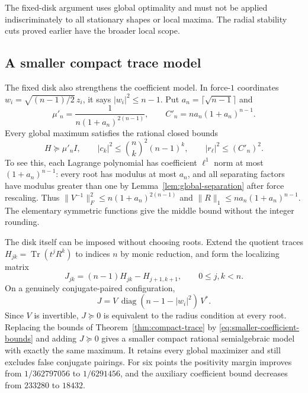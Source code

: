 \documentclass[11pt]{article}
\theoremstyle{remark}
\numberwithin{equation}{section}
\begin{document}
The fixed-disk argument uses global optimality and must not be applied
indiscriminately to all stationary shapes or local maxima. The radial
stability cuts proved earlier have the broader local scope.

\subsection{A smaller compact trace model}
The fixed disk also strengthens the coefficient model. In force-$1$
coordinates $w_i=\sqrt{(n-1)/2}\,z_i$, it says $|w_i|^2\le n-1$.
Put $a_n=\lceil\sqrt{n-1}\rceil$ and
\[
 \mu'_n=\frac1{n(1+a_n)^{2(n-1)}},\qquad
 C'_n=na_n(1+a_n)^{n-1}.
\]
Every global maximum satisfies the rational closed bounds
\begin{equation}\label{eq:smaller-coefficient-bounds}
 H\succeq\mu'_n I,\qquad
 |c_k|^2\le\binom nk^2(n-1)^k,\qquad
 |r_\ell|^2\le(C'_n)^2.
\end{equation}
To see this, each Lagrange polynomial has coefficient $\ell^1$ norm
at most $(1+a_n)^{n-1}$: every root has modulus at most $a_n$,
and all separating factors have modulus greater than one by
Lemma~\ref{lem:global-separation} after force rescaling. Thus
$\|V^{-1}\|_F^2\le n(1+a_n)^{2(n-1)}$ and
$\|R\|_1\le na_n(1+a_n)^{n-1}$. The elementary symmetric functions
give the middle bound without the integer rounding.

The disk itself can be imposed without choosing roots. Extend the
quotient traces $H_{jk}=\operatorname{Tr}(t^jR^k)$ to indices $n$
by monic reduction, and form the localizing matrix
\[
 J_{jk}=(n-1)H_{jk}-H_{j+1,k+1},\qquad 0\le j,k<n.
\]
On a genuinely conjugate-paired configuration,
\[
 J=V\,\operatorname{diag}(n-1-|w_i|^2)\,V^*.
\]
Since $V$ is invertible, $J\succeq0$ is equivalent to the radius
condition at every root. Replacing the bounds of
Theorem~\ref{thm:compact-trace} by
\eqref{eq:smaller-coefficient-bounds} and adding $J\succeq0$ gives
a smaller compact rational semialgebraic model with exactly the
same maximum. It retains every global maximizer and still excludes
false conjugate pairings. For six points the positivity margin
improves from $1/362797056$ to $1/6291456$, and the auxiliary
coefficient bound decreases from $233280$ to $18432$.
\end{document}
